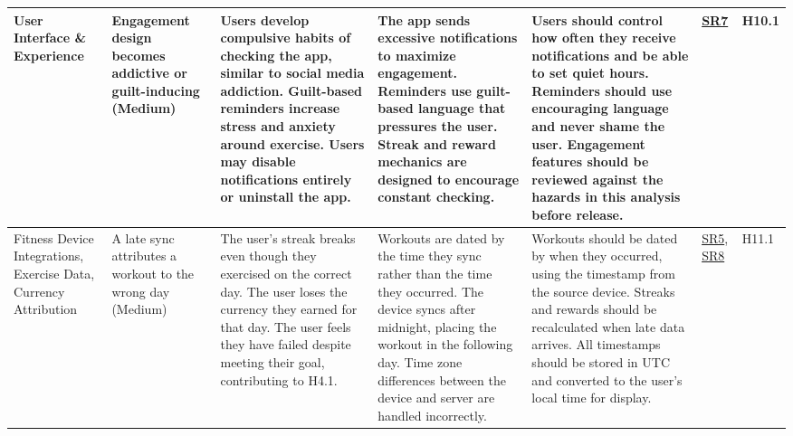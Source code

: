 \documentclass{article}
\begin{document}
\begin{landscape}
{\begin{longtable}{|p{2.5cm}|p{3cm}|p{3.8cm}|p{3.8cm}|p{5.5cm}|p{1.8cm}|p{1cm}|}
            User Interface \& Experience & Engagement design becomes addictive or guilt-inducing (Medium) & \textbullet{} Users develop compulsive habits of checking the app, similar to social media addiction. \newline \textbullet{} Guilt-based reminders increase stress and anxiety around exercise. \newline \textbullet{} Users may disable notifications entirely or uninstall the app. & \textbullet{} The app sends excessive notifications to maximize engagement. \newline \textbullet{} Reminders use guilt-based language that pressures the user. \newline \textbullet{} Streak and reward mechanics are designed to encourage constant checking. & \textbullet{} Users should control how often they receive notifications and be able to set quiet hours. \newline \textbullet{} Reminders should use encouraging language and never shame the user. \newline \textbullet{} Engagement features should be reviewed against the hazards in this analysis before release. & \hyperlink{sr7}{SR7} & H10.1 \\
            \hline
            Fitness Device Integrations, Exercise Data, Currency Attribution & A late sync attributes a workout to the wrong day (Medium) & \textbullet{} The user's streak breaks even though they exercised on the correct day. \newline \textbullet{} The user loses the currency they earned for that day. \newline \textbullet{} The user feels they have failed despite meeting their goal, contributing to H4.1. & \textbullet{} Workouts are dated by the time they sync rather than the time they occurred. \newline \textbullet{} The device syncs after midnight, placing the workout in the following day. \newline \textbullet{} Time zone differences between the device and server are handled incorrectly. & \textbullet{} Workouts should be dated by when they occurred, using the timestamp from the source device. \newline \textbullet{} Streaks and rewards should be recalculated when late data arrives. \newline \textbullet{} All timestamps should be stored in UTC and converted to the user's local time for display. & \hyperlink{sr5}{SR5}, \hyperlink{sr8}{SR8} & H11.1 \\

\end{longtable}}
\end{landscape}
\end{document}
